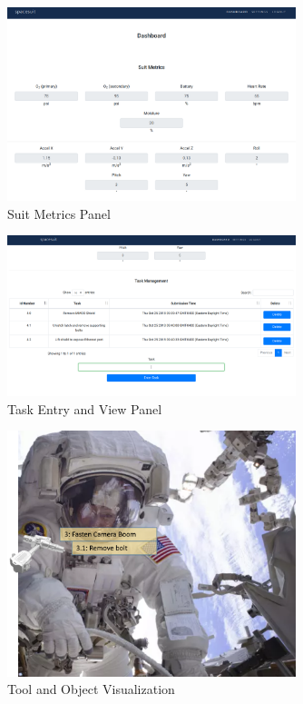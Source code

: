 \documentclass{article}
\begin{document}
\begin{figure}[!htb]
  \centering
  \includegraphics[width=0.75\textwidth]{assets/groundcontrolsuitmetrics.png}
  \caption{Suit Metrics Panel}
  \label{fig:groundcontrolsuitmetrics}
\end{figure}

\begin{figure}[!htb]
  \centering
  \includegraphics[width=0.75\textwidth]{assets/taskmanagment.png}
  \caption{Task Entry and View Panel}
  \label{fig:taskmanagment}
\end{figure}

\begin{figure}[!htb]
  \centering
  \includegraphics[width=0.75\textwidth]{assets/subtask.png}
  \caption{Tool and Object Visualization}
  \label{fig:subtask}
\end{figure}
\end{document}
